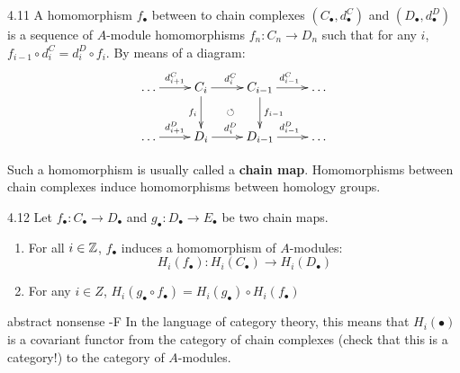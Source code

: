 \documentclass[twoside = false,	%
		headsepline,		%
		parskip = true,
		]{scrbook}						%
\begin{document}
        \begin{definition}{}{4.11}
            A homomorphism $f_\bullet$ between to chain complexes $(C_\bullet,d_\bullet^C)$ and $(D_\bullet,d_\bullet^D)$ is a sequence of $A$-module homomorphisms $f_n: C_n \to D_n$ such that for any $i$, $f_{i-1} \circ d_i^C = d_i^D \circ f_i$. By means of a diagram:
            \begin{equation*}
            \xymatrix {
                \dots \ar[r]^{d_{i+1}^C} & C_i \ar[r]^{d_i^C} \ar[d]_{f_i} & C_{i-1} \ar[r]^{d_{i-1}^C} \ar[d]^{f_{i-1}} & \dots \\
                \dots \ar[r]^{d_{i+1}^D} & D_i \ar[r]^{d_{i}^D} \ar@{}[ur]|{\circlearrowleft} & D_{i-1} \ar[r]^{d_{i-1}^D}& \dots 
            }
            \end{equation*}
        \end{definition}
        Such a homomorphism is usually called a \textbf{chain map}. Homomorphisms between chain complexes induce homomorphisms between homology groups.

        \begin{lemma}{}{4.12}
            Let $f_\bullet: C_\bullet \to D_\bullet$ and $g_\bullet: D_\bullet \to E_\bullet$ be two chain maps.
            \begin{enumerate}
                \item For all $i \in \mathbb Z$, $f_\bullet$ induces a homomorphism of $A$-modules:
                    \begin{equation*}
                        H_i(f_\bullet): H_i(C_\bullet) \to H_i(D_\bullet)
                    \end{equation*}
                \item For any $i \in Z$, $H_i(g_\bullet \circ f_\bullet) = H_i(g_\bullet) \circ H_i(f_\bullet)$
            \end{enumerate}
        \end{lemma}

        \begin{remark*}{abstract nonsense -F}
            In the language of category theory, this means that $H_i(\bullet)$ is a covariant functor from the category of chain complexes (check that this is a category!) to the category of $A$-modules.
        \end{remark*}
\end{document}
